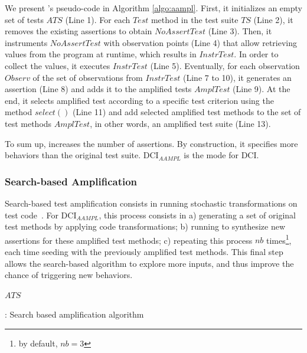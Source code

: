 We present \aampl's pseudo-code in Algorithm \autoref{algo:aampl}. First, it initializes an empty set of tests $ATS$ (Line 1). 
For each $Test$ method in the test suite $TS$ (Line 2), it removes the existing assertions to obtain $NoAssertTest$ (Line 3). 
Then, it instruments $NoAssertTest$ with observation points (Line 4) that allow retrieving values from the program at runtime, which results in $InstrTest$. 
In order to collect the values, it executes $InstrTest$ (Line 5).
Eventually, for each observation $Observ$ of the set of observations from $InstrTest$ (Line 7 to 10), it generates an assertion (Line 8) and adds it to the amplified tests $AmplTest$ (Line 9).
At the end, it selects amplified test according to a specific test criterion using the method $select()$ (Line 11) and add selected amplified test methods to the set of test methods $AmplTest$, in other words, an amplified test suite (Line 13).

To sum up, \aampl increases the number of assertions. 
By construction, it specifies more behaviors than the original test suite.
DCI$_{AAMPL}$ is the \aampl mode for DCI.

%
%
\subsubsection{Search-based Amplification}
\label{subsec:sbampl}
Search-based test amplification consists in running stochastic transformations on test code~\cite{tonella}.
%
For DCI$_{AAMPL}$, this process consists in
a) generating a set of original test methods by applying code transformations;
b) running \aampl to synthesize new assertions for these amplified test methods;
c) repeating this process $nb$ times\footnote{by default, $nb=3$}, each time seeding with the previously amplified test methods.
%
This final step allows the search-based algorithm to explore more inputs, and thus improve the chance of triggering new behaviors.

\begin{algorithm}[h]
\begin{algorithmic}[1]
    \EndFor
\EndFor
\Return $ATS$
\end{algorithmic}
\caption{\sbampl: Search based amplification algorithm}
\label{algo:sbampl}
\end{algorithm}

